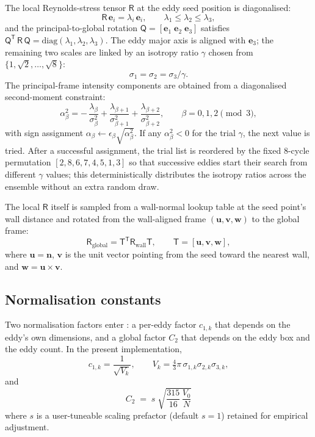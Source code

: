\documentclass[
 amsmath,amssymb,
 aps,
 twocolumn,
]{revtex4-2}
\renewcommand{\vec}[1]{\boldsymbol{#1}}
\newcommand{\bR}{\mathsf{R}}
\newcommand{\bQ}{\mathsf{Q}}
\newcommand{\bT}{\mathsf{T}}
\begin{document}
The local Reynolds-stress tensor $\bR$ at the eddy seed position is
diagonalised:
\begin{equation}\label{eq:Reig}
  \bR\,\vec e_i = \lambda_i\,\vec e_i,\qquad
  \lambda_1\le\lambda_2\le\lambda_3,
\end{equation}
and the principal-to-global rotation $\bQ=[\vec e_1\;\vec e_2\;\vec e_3]$
satisfies $\bQ^{\mathsf T}\,\bR\,\bQ=\mathrm{diag}(\lambda_1,\lambda_2,\lambda_3)$.
The eddy major axis is aligned with $\vec e_3$; the remaining two scales are
linked by an isotropy ratio $\gamma$ chosen from
$\{1,\sqrt2,\dots,\sqrt8\}$:
\begin{equation}\label{eq:gamma}
  \sigma_1 = \sigma_2 = \sigma_3/\gamma.
\end{equation}
The principal-frame intensity components are obtained from a
diagonalised second-moment constraint:
\begin{equation}\label{eq:alpha}
  \alpha_\beta^2
    = -\,\frac{\lambda_\beta}{\sigma_\beta^2}
       + \frac{\lambda_{\beta+1}}{\sigma_{\beta+1}^2}
       + \frac{\lambda_{\beta+2}}{\sigma_{\beta+2}^2},
  \qquad \beta=0,1,2 \pmod 3,
\end{equation}
with sign assignment
$\alpha_\beta\leftarrow\epsilon_\beta\sqrt{\alpha_\beta^2}$. If any
$\alpha_\beta^2<0$ for the trial $\gamma$, the next value is tried.
After a successful assignment, the trial list is reordered by the
fixed 8-cycle permutation $[2,8,6,7,4,5,1,3]$ so that successive eddies start
their search from different $\gamma$ values; this deterministically
distributes the isotropy ratios across the ensemble without an extra
random draw.

The local $\bR$ itself is sampled from a wall-normal lookup table at the
seed point's wall distance and rotated from the wall-aligned frame
$(\vec u,\vec v,\vec w)$ to the global frame:
\begin{equation}\label{eq:Rrot}
  \bR_{\mathrm{global}} = \bT^{\mathsf T} \bR_{\mathrm{wall}} \bT,
  \qquad \bT=[\vec u,\vec v,\vec w],
\end{equation}
where $\vec u=\vec n$, $\vec v$ is the unit vector pointing from the
seed toward the nearest wall, and $\vec w=\vec u\times\vec v$.

\subsection{Normalisation constants}\label{sec:Cconst}

Two normalisation factors enter : a
per-eddy factor $c_{1,k}$ that depends on the eddy's own dimensions, and
a global factor $C_2$ that depends on the eddy box and the eddy count.
In the present implementation,
\begin{equation}\label{eq:c1}
  c_{1,k} = \frac{1}{\sqrt{V_k}},
  \qquad V_k = \tfrac{4}{3}\pi\,\sigma_{1,k}\sigma_{2,k}\sigma_{3,k},
\end{equation}
and
\begin{equation}\label{eq:C2}
  \boxed{\;
  C_2 \;=\; s\;\sqrt{\frac{315}{16}\,\frac{V_0}{N}}\;}
\end{equation}
where $s$ is a user-tuneable scaling prefactor (default $s=1$) retained
for empirical adjustment.
\end{document}
